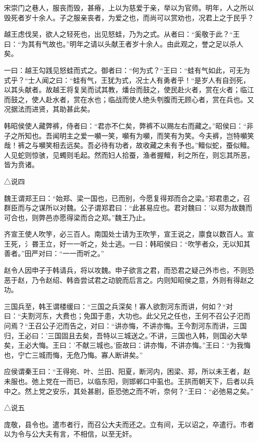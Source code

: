 \documentclass[]{article}
\begin{document}
宋崇门之巷人，服丧而毁，甚瘠，上以为慈爱于亲，举以为官师。明年，人之所以毁死者岁十余人。子之服亲丧者，为爱之也，而尚可以赏劝也，况君上之于民乎？

越王虑伐吴，欲人之轻死也，出见怒蛙，乃为之式。从者曰：``奚敬于此？``王曰：``为其有气故也。''明年之请以头献王者岁十余人。由此观之，誉之足以杀人矣。

一曰：越王勾践见怒蛙而式之。御者曰：``何为式？``王曰：``蛙有气如此，可无为式乎？``士人闻之曰：``蛙有气，王犹为式，况士人有勇者乎！``是岁人有自刭死，以其头献者。故越王将复吴而试其教，燔台而鼓之，使民赴火者，赏在火者；临江而鼓之，使人赴水者，赏在水也；临战而使人绝头刳腹而无顾心者，赏在兵也。又况据法而进贤，其助甚此矣。

韩昭侯使人藏弊裤，侍者曰：``君亦不仁矣，弊裤不以赐左右而藏之。''昭侯曰：``非子之所知也。吾闻明主之爱一嚬一笑，嚬有为嚬，而笑有为笑。今夫裤，岂特嚬笑哉！裤之与嚬笑相去远矣。吾必待有功者，故收藏之未有予也。''鳣似蛇，蚕似鳣。人见蛇则惊骇，见蠋则毛起。然而妇人拾蚕，渔者握鳣，利之所在，则忘其所恶，皆为贲诸。

△说四

魏王谓郑王曰：``始郑、梁一国也，已而别，今愿复得郑而合之梁。''郑君患之，召群臣而与之谋所以对魏。公子谓郑君曰：``此甚易应也。君对魏曰：'以郑为故魏而可合也，则弊邑亦愿得梁而合之郑。''魏王乃止。

齐宣王使人吹竽，必三百人。南国处士请为王吹竽，宣王说之，廪食以数百人。宣王死，氵昬王立，好一一听之，处士逃。一曰：韩昭侯曰：``吹竽者众，无以知其善者。''田严对曰：``一一而听之。''

赵令人因申子于韩请兵，将以攻魏。申子欲言之君，而恐君之疑己外市也，不则恐恶于赵，乃令赵绍、韩沓尝试君之动貌而后言之。内则知昭侯之意，外则有得赵之功。

三国兵至，韩王谓楼缓曰：``三国之兵深矣！寡人欲割河东而讲，何如？``对曰：``夫割河东，大费也；免国于患，大功也。此父兄之任也，王何不召公子汜而问焉？``王召公子汜而告之，对曰：``讲亦悔，不讲亦悔。王今割河东而讲，三国归，王必曰：'三国固且去矣，吾特以三城送之。'不讲，三国也入韩，则国必大举矣，王必大悔。王曰：'不献三城也。'臣故曰：讲亦悔，不讲亦悔。''王曰：``为我悔也，宁亡三城而悔，无危乃悔。寡人断讲矣。''

应侯谓秦王曰：``王得宛、叶、兰田、阳夏，断河内，困梁、郑，所以未王者，赵未服也。弛上党在一而已，以临东阳，则邯郸口中虱也。王拱而朝天下，后者以兵中之。然上党之安乐，其处甚剧，臣恐弛之而不听，奈何？``王曰：``必弛易之矣。''

△说五

庞敬，县令也。遣市者行，而召公大夫而还之。立有间，无以诏之，卒遣行。市者以为令与公大夫有言，不相信，以至无奸。
\end{document}
